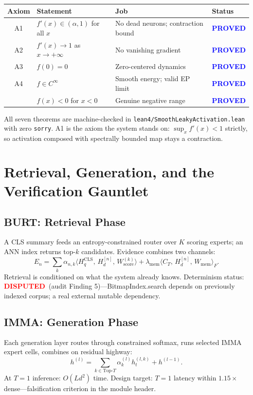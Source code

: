 \documentclass[11pt,letterpaper]{article}
\newcommand{\PROVED}{\textbf{\textcolor{blue}{PROVED}}}
\newcommand{\DISPUTED}{\textbf{\textcolor{red}{DISPUTED}}}
\begin{document}
\begin{center}
\renewcommand{\arraystretch}{1.2}
\begin{tabular}{clll}
\toprule
Axiom & Statement & Job & Status \\
\midrule
A1 & $f'(x) \in (\alpha, 1)$ for all $x$ & No dead neurons; contraction bound & \PROVED \\
A2 & $f'(x) \to 1$ as $x \to +\infty$ & No vanishing gradient & \PROVED \\
A3 & $f(0) = 0$ & Zero-centered dynamics & \PROVED \\
A4 & $f \in C^\infty$ & Smooth energy; valid EP limit & \PROVED \\
  & $f(x) < 0$ for $x < 0$ & Genuine negative range & \PROVED \\
\bottomrule
\end{tabular}
\end{center}

All seven theorems are machine-checked in \texttt{lean4/SmoothLeakyActivation.lean}
with zero \texttt{sorry}.  A1 is the axiom the system stands on:
$\sup_x f'(x) < 1$ strictly, so activation composed with spectrally bounded
map stays a contraction.

\section{Retrieval, Generation, and the Verification Gauntlet}
\label{sec:gauntlet}

\subsection{BURT: Retrieval Phase}

A CLS summary feeds an entropy-constrained router over $K$ scoring experts;
an ANN index returns top-$k$ candidates.  Evidence combines two channels:
\[
E_n = \sum_k \alpha_{n,k} \langle H_q^{\text{CLS}},\, H_d^{[n]},\, W_{\text{score}}^{(k)}\rangle
    + \lambda_{\text{mem}} \langle C_T,\, H_d^{[n]},\, W_{\text{mem}}\rangle_F.
\]
Retrieval is conditioned on what the system already knows.  Determinism status:
\DISPUTED\ (audit Finding 5)---BitmapIndex.search depends on previously indexed
corpus; a real external mutable dependency.

\subsection{IMMA: Generation Phase}

Each generation layer routes through constrained softmax, runs selected IMMA
expert cells, combines on residual highway:
\[
h^{(l)} = \sum_{k \in \text{Top-}T} \alpha_k^{(l)} h_t^{(l,k)} + h^{(l-1)}.
\]
At $T=1$ inference: $O(Ld^2)$ time.
Design target: $T=1$ latency within $1.15\times$ dense---falsification
criterion in the module header.
\end{document}
